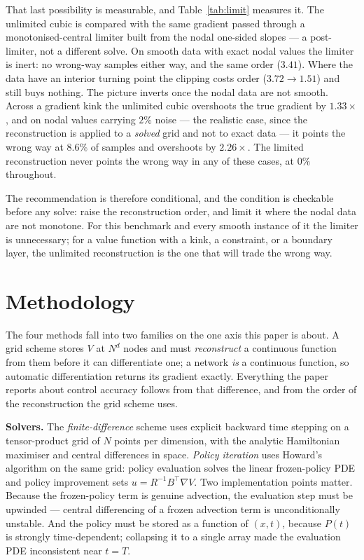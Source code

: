 \documentclass[conference]{IEEEtran}
\begin{document}
That last possibility is measurable, and Table~\ref{tab:limit} measures it. The unlimited cubic is
compared with the same gradient passed through a monotonised-central limiter built from the nodal
one-sided slopes --- a post-limiter, not a different solve. On smooth data with exact nodal values
the limiter is inert: no wrong-way samples either way, and the same order ($3.41$). Where the data
have an interior turning point the clipping costs order ($3.72 \to 1.51$) and still buys nothing.
The picture inverts once the nodal data are not smooth. Across a gradient kink the unlimited cubic
overshoots the true gradient by $1.33\times$, and on nodal values carrying $2\%$ noise --- the
realistic case, since the reconstruction is applied to a \emph{solved} grid and not to exact
data --- it points the wrong way at $8.6\%$ of samples and overshoots by $2.26\times$. The limited
reconstruction never points the wrong way in any of these cases, at $0\%$ throughout.

The recommendation is therefore conditional, and the condition is checkable before any solve: raise
the reconstruction order, and limit it where the nodal data are not monotone. For this benchmark and
every smooth instance of it the limiter is unnecessary; for a value function with a kink, a
constraint, or a boundary layer, the unlimited reconstruction is the one that will trade the wrong
way.



\section{Methodology}\label{sec:setup}

The four methods fall into two families on the one axis this paper is about. A grid scheme stores $V$ at $N^d$ nodes and must \emph{reconstruct} a continuous function from them before it can
differentiate one; a network \emph{is} a continuous function, so automatic differentiation returns
its gradient exactly. Everything the paper reports about control accuracy follows from that
difference, and from the order of the reconstruction the grid scheme uses.

\textbf{Solvers.} The \emph{finite-difference} scheme uses explicit backward time stepping on a
tensor-product grid of $N$ points per dimension, with the analytic Hamiltonian maximiser and
central differences in space. \emph{Policy iteration} uses Howard's algorithm on the same grid:
policy evaluation solves the linear frozen-policy PDE and policy improvement sets
$u = R^{-1}B^\top\nabla V$. Two implementation points matter. Because the frozen-policy term is
genuine advection, the evaluation step must be upwinded --- central differencing of a frozen
advection term is unconditionally unstable. And the policy must be stored as a function of $(x,t)$,
because $P(t)$ is strongly time-dependent; collapsing it to a single array made the evaluation PDE
inconsistent near $t=T$.
\end{document}
